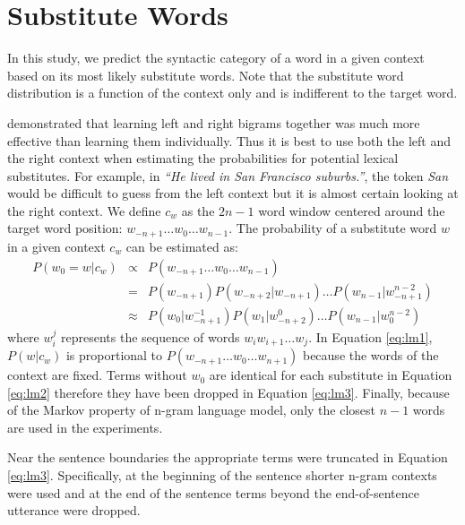 \section{Substitute Words}
\label{sec:substitute_vectors}

In this study, we predict the syntactic category of a word in a given
context based on its most likely substitute words.  Note that the
substitute word distribution is a function of the context only and is
indifferent to the target word.

\cite{20674613} demonstrated that learning left and right bigrams
together was much more effective than learning them individually.
Thus it is best to use both the left and the right context when
estimating the probabilities for potential lexical substitutes.  For
example, in \emph{``He lived in San Francisco suburbs.''}, the token
\emph{San} would be difficult to guess from the left context but it is
almost certain looking at the right context.  We define $c_w$ as the
$2n-1$ word window centered around the target word position: $w_{-n+1}
\ldots w_0 \ldots w_{n-1}$.  The probability of a substitute word $w$
in a given context $c_w$ can be estimated as:
\begin{eqnarray}
  \label{eq:lm1}P(w_0 = w | c_w) & \propto & P(w_{-n+1}\ldots w_0\ldots w_{n-1})\\
  \label{eq:lm2}& = & P(w_{-n+1})P(w_{-n+2}|w_{-n+1})\ldots P(w_{n-1}|w_{-n+1}^{n-2})\\
  \label{eq:lm3}& \approx & P(w_0| w_{-n+1}^{-1})P(w_{1}|w_{-n+2}^0)\ldots P(w_{n-1}|w_0^{n-2})
\end{eqnarray}
where $w_i^j$ represents the sequence of words $w_i w_{i+1} \ldots
w_{j}$.  In Equation \ref{eq:lm1}, $P(w|c_w)$ is proportional to
$P(w_{-n+1}\ldots w_0 \ldots w_{n+1})$ because the words of the
context are fixed.  Terms without $w_0$ are identical for each
substitute in Equation \ref{eq:lm2} therefore they have been dropped
in Equation \ref{eq:lm3}.  Finally, because of the Markov property of
n-gram language model, only the closest $n-1$ words are used in the
experiments.

Near the sentence boundaries the appropriate terms were truncated in
Equation \ref{eq:lm3}.  Specifically, at the beginning of the sentence
shorter n-gram contexts were used and at the end of the sentence terms
beyond the end-of-sentence utterance were dropped.  

